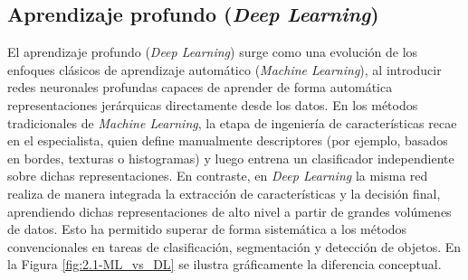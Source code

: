 \subsection{Aprendizaje profundo (\textit{Deep Learning})}

El aprendizaje profundo (\textit{Deep Learning}) surge como una evolución de los enfoques clásicos de aprendizaje automático (\textit{Machine Learning}), al introducir redes neuronales profundas capaces de aprender de forma automática representaciones jerárquicas directamente desde los datos. En los métodos tradicionales de \textit{Machine Learning}, la etapa de ingeniería de características recae en el especialista, quien define manualmente descriptores (por ejemplo, basados en bordes, texturas o histogramas) y luego entrena un clasificador independiente sobre dichas representaciones. En contraste, en \textit{Deep Learning} la misma red realiza de manera integrada la extracción de características y la decisión final, aprendiendo dichas representaciones de alto nivel a partir de grandes volúmenes de datos. Esto ha permitido superar de forma sistemática a los métodos convencionales en tareas de clasificación, segmentación y detección de objetos. En la Figura \ref{fig:2.1-ML_vs_DL} se ilustra gráficamente la diferencia conceptual. \\



